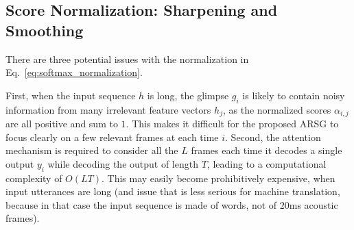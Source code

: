 \documentclass{article} %
\begin{document}



\subsection{Score Normalization: Sharpening and Smoothing}
\label{sec:sharpening}

There are three potential issues with the normalization in
Eq.~\eqref{eq:softmax_normalization}. 

First, when the input sequence $h$ is long, the glimpse $g_i$ is likely to
contain noisy information from many irrelevant feature vectors $h_j$, as the
normalized scores $\alpha_{i,j}$ are all positive and sum to $1$. This makes it
difficult for the proposed ARSG to focus clearly on a few relevant frames at
each time $i$. Second, the attention mechanism is required to consider all the
$L$ frames each time it decodes a single output $y_i$ while decoding the output
of length $T$, leading to a computational complexity of $O(LT)$. This may
easily become prohibitively expensive, when input utterances are long
(and issue that is less serious for machine translation, because in that
case the input sequence is made of words, not of 20ms acoustic frames).
\end{document}
